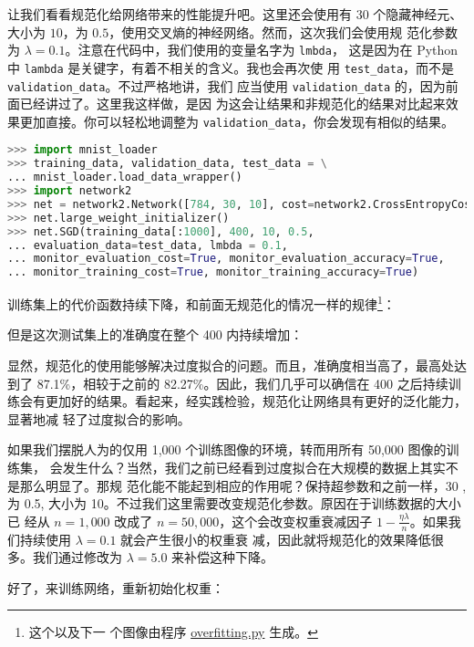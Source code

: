 让我们看看规范化给网络带来的性能提升吧。这里还会使用有 $30$ 个隐藏神经元、\minibatch{}
大小为 $10$，\learningrate{}为 $0.5$，使用交叉熵的神经网络。然而，这次我们会使用规
范化参数为 $\lambda = 0.1$。注意在代码中，我们使用的变量名字为 \lstinline!lmbda!，
这是因为在 Python 中 \lstinline!lambda! 是关键字，有着不相关的含义。我也会再次使
用 \lstinline!test_data!，而不是 \lstinline!validation_data!。不过严格地讲，我们
应当使用 \lstinline!validation_data! 的，因为前面已经讲过了。这里我这样做，是因
为这会让结果和非规范化的结果对比起来效果更加直接。你可以轻松地调整为
\lstinline!validation_data!，你会发现有相似的结果。

\begin{lstlisting}[language=Python]
>>> import mnist_loader
>>> training_data, validation_data, test_data = \
... mnist_loader.load_data_wrapper()
>>> import network2
>>> net = network2.Network([784, 30, 10], cost=network2.CrossEntropyCost)
>>> net.large_weight_initializer()
>>> net.SGD(training_data[:1000], 400, 10, 0.5,
... evaluation_data=test_data, lmbda = 0.1,
... monitor_evaluation_cost=True, monitor_evaluation_accuracy=True,
... monitor_training_cost=True, monitor_training_accuracy=True)
\end{lstlisting}

训练集上的代价函数持续下降，和前面无规范化的情况一样的规律\footnote{这个以及下一
  个图像由程序
  \href{https://github.com/mnielsen/neural-networks-and-deep-learning/blob/master/fig/overfitting.py}{overfitting.py}
  生成。}：

但是这次测试集上的准确度在整个 400 \epochs{}内持续增加：

显然，规范化的使用能够解决过度拟合的问题。而且，准确度相当高了，最高处达到了
87.1\%，相较于之前的 82.27\%。因此，我们几乎可以确信在 400 \epochs{}之后持续训
练会有更加好的结果。看起来，经实践检验，规范化让网络具有更好的泛化能力，显著地减
轻了过度拟合的影响。

如果我们摆脱人为的仅用 1,000 个训练图像的环境，转而用所有 50,000 图像的训练集，
会发生什么？当然，我们之前已经看到过度拟合在大规模的数据上其实不是那么明显了。那规
范化能不能起到相应的作用呢？保持超参数和之前一样，30 \epochs{}, \learningrate{}为 0.5,
\minibatch{}大小为 10。不过我们这里需要改变规范化参数。原因在于训练数据的大小已
经从 $n=1,000$ 改成了 $n=50,000$，这个会改变权重衰减因子
$1-\frac{\eta\lambda}{n}$。如果我们持续使用 $\lambda = 0.1$ 就会产生很小的权重衰
减，因此就将规范化的效果降低很多。我们通过修改为 $\lambda = 5.0$ 来补偿这种下降。

好了，来训练网络，重新初始化权重：

